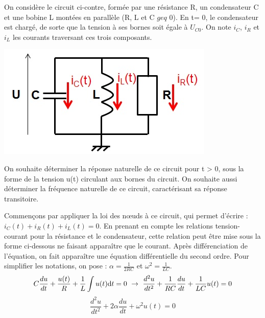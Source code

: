 \documentclass[]{book}
\begin{document}
{	\begin{minipage}[l]{0.7\linewidth}
		On considère le circuit ci-contre, formée par une résistance R, un condensateur C et une bobine L montées en parallèle (R, L et C $geq$ 0). En t= 0, le condensateur est chargé, de sorte que la tension à ses bornes soit égale à $U_{C0}$. On note $i_{C}$, $i_{R}$ et $i_{L}$ les courants traversant ces trois composants. 	
	\end{minipage} \hfill
	\begin{minipage}[r]{0.4\linewidth}
		\includegraphics[scale=0.5]{images/circuit_RLC_reponse_naturelle.jpg} 	
	\end{minipage}
	\vspace{0.5\baselineskip}
	On souhaite déterminer la réponse naturelle de ce circuit pour t > 0, sous la forme de la tension u(t) circulant aux bornes du circuit. On souhaite aussi déterminer la fréquence naturelle de ce circuit, caractérisant sa réponse transitoire.

	\vspace{1\baselineskip}
	Commençons par appliquer la loi des nœuds à ce circuit, qui permet d'écrire : $i_{C}(t)+i_{R}(t)+i_{L}(t)=0.$ En prenant en compte les relations tension-courant pour la résistance et le condensateur, cette relation peut être mise sous la forme ci-dessous ne faisant apparaître que le courant. Après différenciation de l'équation, on fait apparaître une équation différentielle du second ordre. Pour simplifier les notations, on pose : $\alpha = \frac{1}{2RC} $ et $\omega^{2} = \frac{1}{LC}$.
	\begin{equation*}
	C\frac{du}{dt}+\frac{u(t)}{R}+\frac{1}{L}\int u(t) \mathrm{d} t=0~\rightarrow ~\frac{d^{2}u}{dt^{2}}+\frac{1}{RC}\frac{du}{dt}+\frac{1}{LC}u(t) = 0
	\end{equation*}
	\begin{equation*}
	\frac{d^{2}u}{dt^{2}}+2\alpha \frac{du}{dt}+\omega^{2}u(t) = 0
	\end{equation*}
	
}
\end{document}
